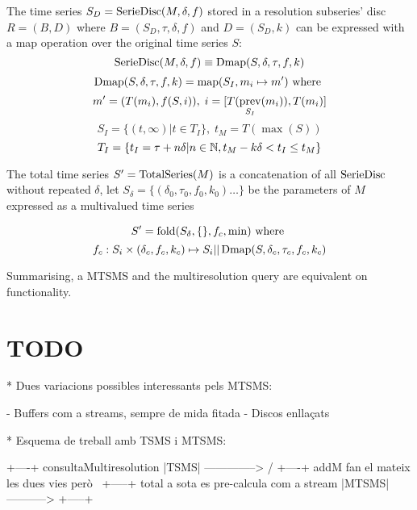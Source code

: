 The time series $S_D=\operatorname{SerieDisc}(M,\delta,f)$ stored in a resolution
subseries' disc $R=(B,D)$ where $B=(S_D,\tau,\delta,f)$ and
$D=(S_D,k)$ can be expressed with a map operation over the original
time series $S$:
\[
\operatorname{SerieDisc}(M,\delta,f) \equiv \operatorname{Dmap}(S,\delta,\tau,f,k)
\]
\[
\operatorname{Dmap}(S,\delta,\tau,f,k) = \operatorname*{map}(S_I, m_i\mapsto m') \text{ where }
\]
\[
 m' = (T(m_i), f(S, i)),\;  i = [T(\operatorname*{prev}_{S_I}(m_i)),T(m_i)]
\]
\[
 S_I = \{ (t,\infty) | t\in T_I  \},\;  t_M = T(\max(S))
\]
\[
T_I = \{ t_I = \tau+n\delta | n\in\mathbb{N}, t_M - k\delta < t_I \leq t_M \}
\]


The total time series $S'=\operatorname{TotalSeries}(M)$ is a concatenation of all $\operatorname{SerieDisc}$ without repeated $\delta$, let $S_\delta = \{ (\delta_0,\tau_0,f_0,k_0)\ldots\}$ be the parameters of $M$ expressed as a multivalued time series \todo{}

\[
S' = \operatorname*{fold}(S_\delta,\{\},f_c,\min) \text{ where }
\]
\[
f_c: S_i \times (\delta_c,f_c,k_c) \mapsto S_i || \operatorname{Dmap}(S,\delta_c,\tau_c,f_c,k_c)
\]




Summarising, a MTSMS and the multiresolution query are equivalent on functionality. 


\section{TODO}




* Dues variacions possibles interessants pels MTSMS:

 
  - Buffers com a streams, sempre de mida fitada 
  - Discos enllaçats

* Esquema de treball amb TSMS i MTSMS:


        +----+  consultaMultiresolution
        |TSMS| --------------> 
     /  +----+
addM                              fan el mateix les dues vies però
     \  +-----+  total            a sota es pre-calcula com a stream
        |MTSMS| -----------> 
        +-----+











